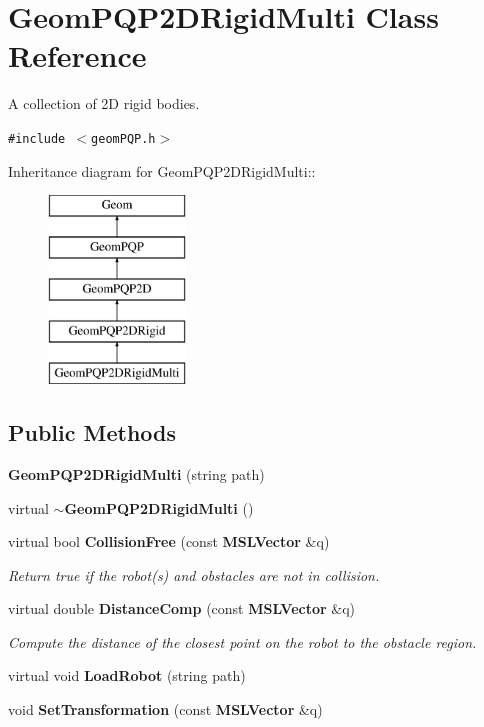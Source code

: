 \section{Geom\-PQP2DRigid\-Multi  Class Reference}
\label{classGeomPQP2DRigidMulti}
A collection of 2D rigid bodies. 


{\tt \#include $<$geom\-PQP.h$>$}

Inheritance diagram for Geom\-PQP2DRigid\-Multi::\begin{figure}[H]
\begin{center}
\leavevmode
\includegraphics[height=5cm]{classGeomPQP2DRigidMulti}
\end{center}
\end{figure}
\subsection*{Public Methods}
\begin{CompactItemize}
\item 
{\bf Geom\-PQP2DRigid\-Multi} (string path)
\item 
virtual {\bf $\sim$Geom\-PQP2DRigid\-Multi} ()
\item 
virtual bool {\bf Collision\-Free} (const {\bf MSLVector} \&q)
\begin{CompactList}\small\item\em Return true if the robot(s) and obstacles are not in collision.\item\end{CompactList}\item 
virtual double {\bf Distance\-Comp} (const {\bf MSLVector} \&q)
\begin{CompactList}\small\item\em Compute the distance of the closest point on the robot to the obstacle region.\item\end{CompactList}\item 
virtual void {\bf Load\-Robot} (string path)
\item 
void {\bf Set\-Transformation} (const {\bf MSLVector} \&q)
\end{CompactItemize}

